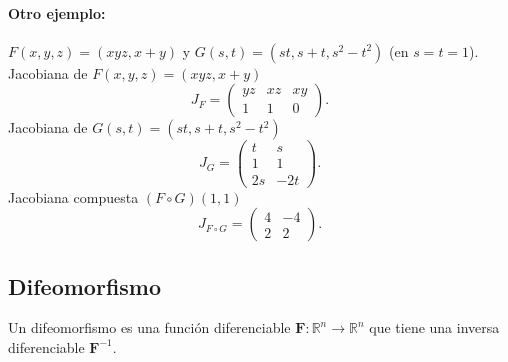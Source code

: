 \documentclass[11pt]{book}
\theoremstyle{definicion}
\theoremstyle{teorema}
\theoremstyle{ejemplo}
\begin{document}

\paragraph{Otro ejemplo:} 
$F(x,y,z)=(xyz,x+y)$ y $ G(s,t) = (st,s+t,s^2-t^2)$ (en $s=t=1$).
%
%
{Jacobiana de \( F(x,y,z) = (xyz, x+y) \)}
\[
J_F = \begin{pmatrix}
yz & xz & xy \\
1 & 1 & 0
\end{pmatrix}.
\]
{Jacobiana de \( G(s,t) = (st, s+t, s^2-t^2) \)}
\[
J_G = \begin{pmatrix}
t & s \\
1 & 1 \\
2s & -2t
\end{pmatrix}.
\]
{Jacobiana compuesta \( (F \circ G)(1,1) \)}
\[
J_{F \circ G} = \begin{pmatrix}
4 & -4 \\
2 & 2
\end{pmatrix}.
\]


\subsection{Difeomorfismo}
\noindent
Un difeomorfismo es una función diferenciable \( \mathbf{F}: \mathbb{R}^n \to \mathbb{R}^n \) que tiene una inversa diferenciable \( \mathbf{F}^{-1} \).
\end{document}
